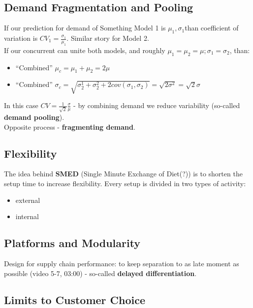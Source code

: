 \documentclass{scrartcl}
\begin{document}
\subsection{Demand Fragmentation and Pooling}
\label{sec:05-05}
If our prediction for demand of Something Model 1 is $\mu_1, \sigma_1$than coefficient of variation is $CV_1 = \frac{\sigma_1}{\mu_1}$. Similar story for Model 2.\\

If our concurrent can unite both models, and roughly $\mu_1 = \mu_2 = \mu; \sigma_1 = \sigma_2$, than:
\begin{itemize}
\item ``Combined'' $\mu_c = \mu_1 + \mu_2 = 2\mu$
\item ``Combined'' $\sigma_c = \sqrt{ \sigma_2^1 + \sigma_2^2 + 2 cov(\sigma_1, \sigma_2)} = \sqrt{2 \sigma^2} = \sqrt 2 \sigma$
\end{itemize}
In this case $CV = \frac1{\sqrt{2}} \frac\sigma\mu$ - by combining demand we reduce variability (so-called {\bf demand pooling}).\\

Opposite process - {\bf fragmenting demand}.

\subsection{Flexibility}
\label{sec:05-06}

The idea behind {\bf SMED} (Single Minute Exchange of Diet(?))  is to shorten the setup time to increase flexibility. Every setup is divided in two types of activity:
\begin{itemize}



\item external
\item internal
\end{itemize}

\subsection{Platforms and Modularity}
\label{sec:05-07}
Design for supply chain performance: to keep separation to as late moment as possible (video 5-7, 03:00) - so-called {\bf delayed differentiation}.

\subsection{Limits to Customer Choice}
\label{sec:05-08}
\end{document}
